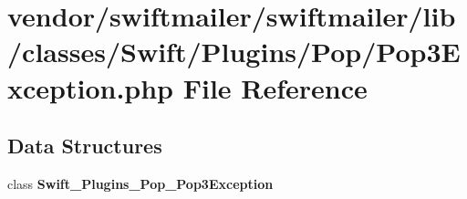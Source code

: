 \section{vendor/swiftmailer/swiftmailer/lib/classes/\+Swift/\+Plugins/\+Pop/\+Pop3\+Exception.php File Reference}
\label{_pop3_exception_8php}
\subsection*{Data Structures}
\begin{DoxyCompactItemize}
\item 
class {\bf Swift\+\_\+\+Plugins\+\_\+\+Pop\+\_\+\+Pop3\+Exception}
\end{DoxyCompactItemize}

